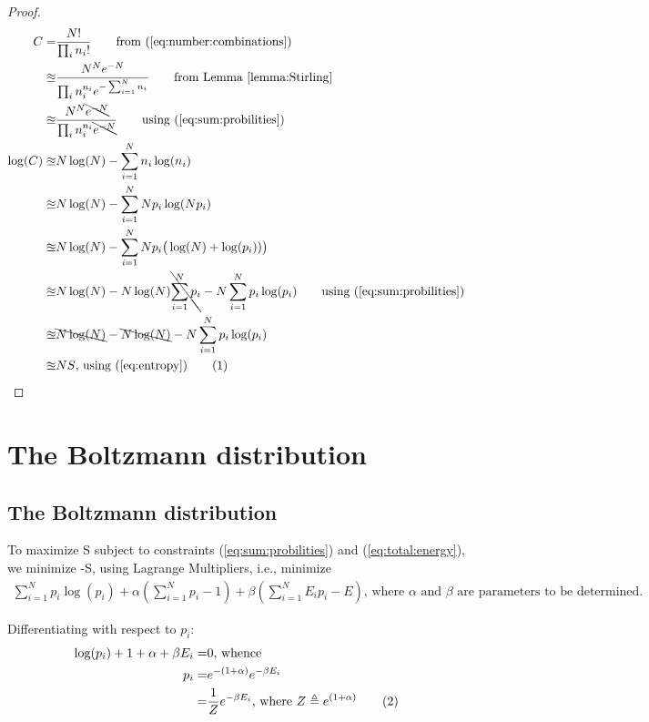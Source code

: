 \documentclass[]{article}
\newcommand\numberthis{\addtocounter{equation}{1}\tag{\theequation}}
\begin{document}
\begin{proof}
	\begin{align*}
	C=&\frac{N!}{\prod_{i}n_i!} \tag*{from (\ref{eq:number:combinations})}\\
	\approxeq& \frac{N^N e^{-N}}{\prod_{i}n_i^{n_i} e^{-\sum_{i=1}^{N}n_i}}\tag*{from Lemma \ref{lemma:Stirling}}\\
	\approxeq& \frac{N^N \bcancel{e^{-N}}}{\prod_{i}n_i^{n_i} \bcancel{e^{-N}}}\tag*{using (\ref{eq:sum:probilities})}\\
	\log(C) \approxeq & N \log(N) - \sum_{i=1}^{N} n_i \log(n_i)\\
	\approxeq& N \log(N) - \sum_{i=1}^{N} N p_i \log(N p_i)\\
	\approxeq& N \log(N) - \sum_{i=1}^{N} N p_i \big(\log(N) + \log(p_i))\big)\\
	\approxeq& N \log(N) -  N \log(N) \bcancel{\sum_{i=1}^{N} p_i}  - N \sum_{i=1}^{N}p_i \log(p_i)\tag*{using (\ref{eq:sum:probilities})}\\
	\approxeq& \bcancel{N \log(N)} - \bcancel{N \log(N)}  - N \sum_{i=1}^{N}p_i \log(p_i)\\
	\approxeq& NS \text{, using (\ref{eq:entropy})} \numberthis \label{eq:entropy:logC}
	\end{align*}
\end{proof}

\section{The Boltzmann distribution}

\subsection{The Boltzmann distribution}

To maximize S subject to constraints (\ref{eq:sum:probilities}) and (\ref{eq:total:energy}), we minimize -S, using Lagrange Multipliers, i.e., minimize
\begin{align*}
\sum_{i=1}^{N}p_i \log(p_i) + \alpha(\sum_{i=1}^{N} p_i-1) + \beta(\sum_{i=1}^{N} E_i p_i-E)\text{, where $\alpha$ and $\beta$ are parameters to be determined.}
\end{align*}

Differentiating with respect to $p_i$:
\begin{align*}
\log(p_i)+1 + \alpha +\beta E_i=&0\text{, whence}\\
p_i =& e^{-(1+\alpha)} e^{-\beta E_i}\\
=& \frac{1}{Z} e^{-\beta E_i}\text{, where $Z\triangleq e^{(1+\alpha)}$} \numberthis\label{eq:maximize:entropy}
\end{align*}
\end{document}
